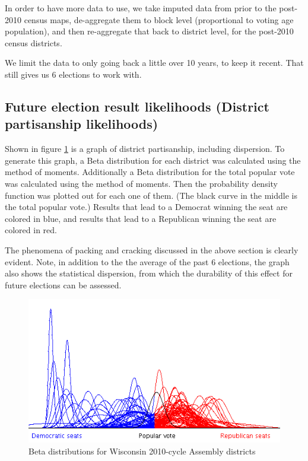 \documentclass[preprint,12pt]{article}
\begin{document}
In order to have more data to use, we take imputed data from prior to the post-2010 census maps, de-aggregate them to block level (proportional to voting age population), and then re-aggregate that back to district level, for the post-2010 census districts.
 
We limit the data to only going back a little over 10 years, to keep it recent.  That still gives us 6 elections to work with.
 
\subsection{Future election result likelihoods (District partisanship likelihoods)}
 
Shown in figure \ref{fig:Betas} is a graph of district partisanship, including dispersion.  To generate this graph, a Beta distribution for each district was calculated using the method of moments.  Additionally a Beta distribution for the total popular vote was calculated using the method of moments.  Then the probability density function was plotted out for each one of them.  (The black curve in the middle is the total popular vote.) Results that lead to a Democrat winning the seat are colored in blue, and results that lead to a Republican winning the seat are colored in red.
 
The phenomena of packing and cracking discussed in the above section is clearly evident.  Note, in addition to the the average of the past 6 elections, the graph also shows the statistical dispersion, from which the durability of this effect for future elections can be assessed.

\begin{figure}[htb!]
    \begin{center}
        \includegraphics[scale=1.0]{../Figures/WI2010/betas.png}
        \caption{Beta distributions for Wisconsin 2010-cycle Assembly districts}\label{fig:Betas}
    \end{center}
\end{figure}
 
\end{document}
